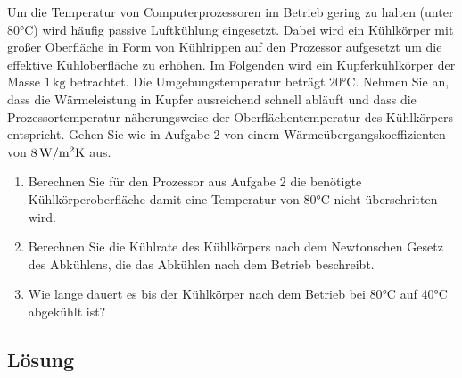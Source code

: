 \documentclass[german,12pt]{homework}
\begin{document}
    \begin{problem}
        Um die Temperatur von Computerprozessoren im Betrieb gering zu halten
        (unter \(80\si{\degreeCelsius}\)) wird häufig passive Luftkühlung
        eingesetzt. Dabei wird ein Kühlkörper mit großer Oberfläche in Form von
        Kühlrippen auf den Prozessor aufgesetzt um die effektive Kühloberfläche
        zu erhöhen. Im Folgenden wird ein Kupferkühlkörper der Masse
        \(1\,\si{\kilogram}\) betrachtet. Die Umgebungstemperatur beträgt
        \(20\si{\degreeCelsius}\). Nehmen Sie an, dass die Wärmeleistung in
        Kupfer ausreichend schnell abläuft und dass die Prozessortemperatur
        näherungsweise der Oberflächentemperatur des Kühlkörpers entspricht.
        Gehen Sie wie in Aufgabe 2 von einem Wärmeübergangskoeffizienten von
        \(8\,\si{\watt\per{\meter\squared\kelvin}}\) aus.
        \begin{enumerate}
            \item Berechnen Sie für den Prozessor aus Aufgabe 2 die benötigte
            Kühlkörperoberfläche damit eine Temperatur von
            \(80\si{\degreeCelsius}\) nicht überschritten wird.
            \item Berechnen Sie die Kühlrate des Kühlkörpers nach dem
            Newtonschen Gesetz des Abkühlens, die das Abkühlen nach dem Betrieb
            beschreibt.
            \item Wie lange dauert es bis der Kühlkörper nach dem Betrieb bei
            \(80\si{\degreeCelsius}\) auf \(40\si{\degreeCelsius}\) abgekühlt
            ist?
        \end{enumerate}
    \end{problem}

    \subsection*{Lösung}
\end{document}
